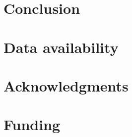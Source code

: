 \documentclass[hidelinks]{article}
\begin{document}

    






\section*{Conclusion}
    \label{conclusion}

\section*{Data availability}\label{data_availability}


\section*{Acknowledgments}\label{acknowledgements}

\section*{Funding}
    \label{funding}

\printbibliography
\end{document}
